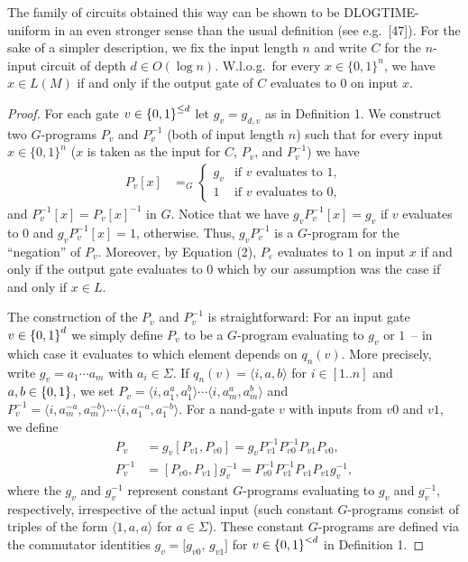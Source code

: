 \documentclass[10pt,a4paper]{article}
\newcommand{\oneset}[1]{\left\{\mathinner{#1}\right\}}
\newcommand{\ccinterval}[2]{[{#1}..{#2}]}
\newcommand{\eps}{\varepsilon}
\begin{document}
The family of circuits obtained this way can be shown to be DLOGTIME-uniform in an even stronger sense than the usual definition (see e.g.\ [47]). For the sake of a simpler description, we fix the input length $n$ and write $C$ for the $n$-input circuit of depth $d\in O(\log n)$. W.l.o.g.\ for every $x\in\{0,1\}^n$, we have $x\in L(M)$ if and only if the output gate of $C$ evaluates to $0$ on input $x$.
\begin{proof}
  For each gate $v \in \oneset{0,1}^{\leq d}$ let
  $g_v = g_{d,v}$ as in Definition 1. We construct two $G$-programs $P_v$
  and $P_v^{-1}$ (both of input length $n$) such that for every input $x \in \{0,1\}^n$
  ($x$ is taken as the input for $C$,  $P_v$, and $P_v^{-1}$) we have
  \begin{align}\label{eq:pvdef}\tag{2}
    P_v[x] &=_G \begin{cases}
      g_v &\text{if } v \text{ evaluates to } 1,\\
      1 &\text{if } v \text{ evaluates to } 0, 		
    \end{cases} 
  \end{align}
  and $P_v^{-1}[x] = P_v[x]^{-1}$ in $G$.  Notice that we have
  $g_v P_v^{-1}[x] = g_v$ if $v$ evaluates to $0$ and $g_v P_v^{-1}[x] = 1$,
  otherwise. Thus, $g_v P_v^{-1}$ is a $G$-program for the ``negation''
  of $P_v$. Moreover, by Equation (2), $P_\eps$ evaluates to $1$ on input $x$ if and only if the output gate evaluates to $0$ which by our assumption was the case if and only if  $x \in L$.
	
  The construction of the $P_v$ and $P_v^{-1}$ is straightforward:
  For an input gate $v \in \oneset{0,1}^{d}$ we simply define $P_v$ to be a $G$-program evaluating to $g_v$ or $1$~-- in which case it evaluates to which element depends on $q_n(v)$. %
  More precisely, write $g_v = a_1\cdots a_m$ with $a_i \in \Sigma$. If $q_n(v) = \langle i, a,b\rangle$ for $i \in \ccinterval{1}{n}$ and $a,b \in \oneset{0,1}$, we set 
  $P_v =  \langle i, a_1^a,a_1^b\rangle \cdots  \langle i, a_m^a,a_m^b\rangle$ and $P_v^{-1} =  \langle i, a^{-a}_m,a^{-b}_m\rangle \cdots  \langle i, a^{-a}_1,a^{-b}_1\rangle$.
  For a {\sf nand}-gate $v$ with
  inputs from $v0$ and $v1$, we define
  \begin{align*}
    P_v &= g_v [P_{v1}, P_{v0}]=g_v  P_{v1}^{-1}  P_{v0}^{-1} P_{v1} P_{v0}, \\
    P_v^{-1} &=  [P_{v0}, P_{v1}] g_v^{-1}= P_{v0}^{-1} P_{v1}^{-1}  P_{v1} P_{v1} g_v^{-1},
  \end{align*}
  where the $g_v$  and $g_v^{-1}$ represent constant
  $G$-programs evaluating to $g_v$ and $g_v^{-1}$, respectively, irrespective of the actual input
  (such constant $G$-programs consist of triples of the form $\langle 1, a,a\rangle$ for $a \in \Sigma$). These
  constant $G$-programs are defined via the commutator identities
  $g_v = \bigl[ g_{v0},\, g_{v1} \bigr]$ for $v \in \oneset{0,1}^{< d}$ in
  Definition 1.


\end{proof}
\end{document}
